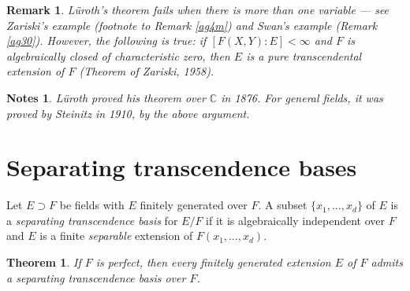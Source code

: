 \documentclass[a4paper,11pt,final,openany]{memoir}
\newtheorem{theorem}[X]{Theorem}
\newtheorem{remark}[X]{Remark}
\newtheorem*{nt}{Notes}
\theoremstyle{nonumberplain}
\begin{document}
\begin{remark}
\label{te18}L\"{u}roth's theorem fails when there is more than one variable
--- see Zariski's example (footnote to Remark \ref{ag4m}) and Swan's example
(Remark \ref{ag30}). However, the following is true: if $[F(X,Y)\colon
E]<\infty$ and $F$ is algebraically closed of characteristic zero, then $E$ is
a pure transcendental extension of $F$ (Theorem of Zariski, 1958).
\end{remark}

\begin{nt}
L\"{u}roth proved his theorem over $\mathbb{C}{}$ in 1876. For general fields,
it was proved by Steinitz in 1910, by the above argument.
\end{nt}

\section{Separating transcendence bases}

Let $E\supset F$ be fields with $E$ finitely generated over $F$. A subset
$\{x_{1},\ldots,x_{d}\}$ of $E$ is a%
\emph{separating transcendence basis }for $E/F$ if it is algebraically
independent over $F$ and $E$ is a finite \textit{separable} extension of
$F(x_{1},\ldots,x_{d})$.

\begin{theorem}
\label{te19}If $F$ is perfect, then every finitely generated extension $E$ of
$F$ admits a separating transcendence basis over $F$.
\end{theorem}
\end{document}
